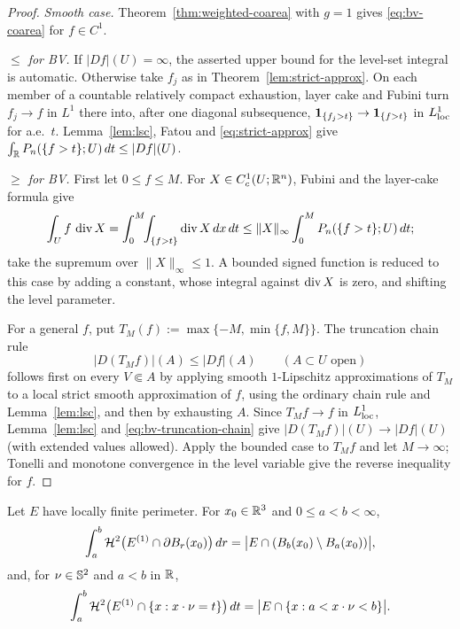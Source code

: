 \begin{proof}
\emph{Smooth case.} Theorem~\ref{thm:weighted-coarea} with $g=1$ gives
\eqref{eq:bv-coarea} for $f\in C^1$.

\emph{$\le$ for BV.} If $|Df|(U)=\infty$, the asserted upper bound for the
level-set integral is automatic.  Otherwise take $f_j$ as in
Theorem~\ref{lem:strict-approx}.  On each member of a countable relatively
compact exhaustion, layer cake and Fubini turn $f_j\to f$ in $L^1$ there
into, after one diagonal subsequence,
$\mathbf 1_{\{f_j>t\}}\to\mathbf 1_{\{f>t\}}$ in $L^1_{\mathrm{loc}}$ for a.e.\ $t$.  Lemma~\ref{lem:lsc},
Fatou and \eqref{eq:strict-approx} give
$\int_\mathbb RP_n(\{f>t\};U)\,dt\le|Df|(U)$.

\emph{$\ge$ for BV.} First let $0\le f\le M$.  For $X\in C^1_c(U;\mathbb R^n)$,
Fubini and the layer-cake formula give
\[
  \int_Uf\,\operatorname{div} X=\int_0^M\!\!\int_{\{f>t\}}\operatorname{div} X\,dx\,dt
  \le\|X\|_\infty\int_0^MP_n(\{f>t\};U)\,dt ;
\]
take the supremum over $\|X\|_\infty\le1$.  A bounded signed function is
reduced to this case by adding a constant, whose integral against
$\operatorname{div} X$ is zero, and shifting the level parameter.

For a general $f$, put $T_M(f):=\max\{-M,\min\{f,M\}\}$.  The truncation
chain rule
\begin{equation}\label{eq:bv-truncation-chain}
  |D(T_Mf)|(A)\le |Df|(A)\qquad(A\subset U\text{ open})
\end{equation}
follows first on every $V\Subset A$ by applying smooth $1$-Lipschitz
approximations of $T_M$ to a local strict smooth approximation of $f$, using
the ordinary chain rule and Lemma~\ref{lem:lsc}, and then by exhausting $A$.
Since $T_Mf\to f$ in $L^1_{\rm loc}$,
Lemma~\ref{lem:lsc} and \eqref{eq:bv-truncation-chain} give
$|D(T_Mf)|(U)\to|Df|(U)$ (with extended values allowed).  Apply the bounded
case to $T_Mf$ and let $M\to\infty$; Tonelli and monotone convergence in the
level variable give the reverse inequality for $f$.
\end{proof}

\begin{corollary}\label{cor:slicing}
Let $E$ have locally finite perimeter.  For $x_0\in\mathbb R^3$ and
$0\le a<b<\infty$,
\[
  \int_a^b\mathcal H^2\bigl(E^{(1)}\cap\partial B_r(x_0)\bigr)\,dr
  =\bigl|E\cap(B_b(x_0)\setminus B_a(x_0))\bigr| ,
\]
and, for $\nu\in\mathbb S^2$ and $a<b$ in $\mathbb R$,
\[
 \int_a^b\mathcal H^2\bigl(E^{(1)}\cap\{x:x\cdot\nu=t\}\bigr)\,dt
 =\bigl|E\cap\{x:a<x\cdot\nu<b\}\bigr|.
\]
\end{corollary}


